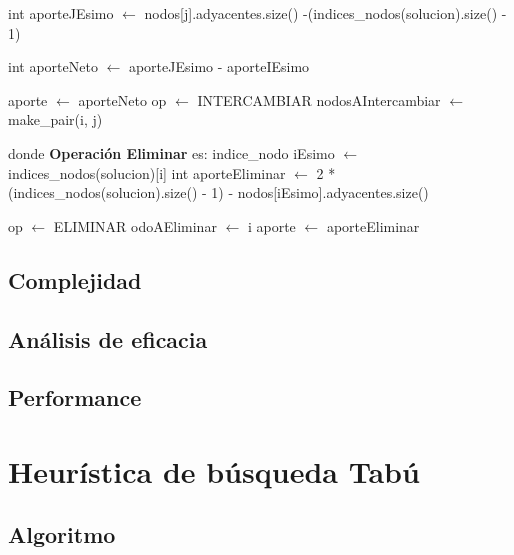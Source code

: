 \documentclass[a4paper, 10pt, twoside]{article}
\newenvironment{pseudo}[1][]{%
    \vspace{1em}%
    \begin{algorithmic}%
}
{%
    \end{algorithmic}%
    \vspace{1em}%
}
\begin{document}
\begin{pseudo}
					\State int aporteJEsimo $\leftarrow$ nodos[j].adyacentes.size() -(indices\_nodos(solucion).size() - 1)

					\State int aporteNeto $\leftarrow$ aporteJEsimo - aporteIEsimo

						\State aporte $\leftarrow$ aporteNeto
						\State op $\leftarrow$ INTERCAMBIAR
						\State nodosAIntercambiar $\leftarrow$ make\_pair(i, j)
					\EndIf
				\EndIf
			\EndFor		

\State
\State donde \textbf{Operación Eliminar} es:
\State
			\State indice\_nodo iEsimo $\leftarrow$ indices\_nodos(solucion)[i]
			\State int aporteEliminar $\leftarrow$ 2 * (indices\_nodos(solucion).size() - 1) - nodos[iEsimo].adyacentes.size()

				\State op $\leftarrow$ ELIMINAR
				\State odoAEliminar $\leftarrow$ i
				\State aporte $\leftarrow$ aporteEliminar
			\EndIf
		\EndFor


\end{pseudo}

\subsection{Complejidad}
\subsection{Análisis de eficacia}

\subsection{Performance}



\newpage

\section{Heurística de búsqueda Tabú}
\subsection{Algoritmo}
\end{document}
